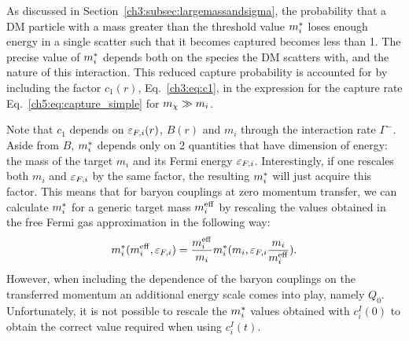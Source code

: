 As discussed in Section~\ref{ch3:subsec:largemassandsigma}, the probability that a DM particle with a mass greater than the threshold value $m_i^*$ loses enough energy in a single scatter such that it becomes captured becomes less than 1. The precise value of $m_i^*$ depends both on the species the DM scatters with, and the nature of this interaction.  
This reduced capture probability is accounted for by including the factor $c_1(r)$, Eq.~\ref{ch3:eq:c1}, in the expression for the capture rate Eq.~\ref{ch5:eq:capture_simple} for $m_\chi\gg m_i$. 

Note that $c_1$ depends on $\varepsilon_{F,i}(r)$, $B(r)$ and $m_i$ through the interaction rate $\Gamma^-$.
Aside from $B$, $m_i^*$ depends only on 2 quantities that have dimension of energy: the mass of the target $m_i$ and its Fermi energy $\varepsilon_{F,i}$. 
Interestingly, if one rescales both $m_i$ and $\varepsilon_{F,i}$ by the same factor, the resulting $m_i^*$ will just acquire this factor. 
This means that for baryon couplings at zero momentum transfer, we can calculate $m_i^*$ for a generic target mass $m_i^{\rm eff}$ by rescaling the values obtained in the free Fermi gas approximation in the following way: 
\begin{equation}
m_i^*(m_i^{\rm eff}, \varepsilon_{F,i})= \frac{m_i^{\rm eff}}{m_i} m_i^*(m_i,\varepsilon_{F,i}\frac{m_i}{m_i^{\rm eff}}).
\end{equation}
However, when including the dependence of the baryon couplings on the transferred momentum an additional energy scale comes into play, namely $Q_0$. Unfortunately, it is not possible to rescale the $m_i^*$ values obtained with $c_i^I(0)$ to obtain the correct value required when using $c_i^I(t)$.




